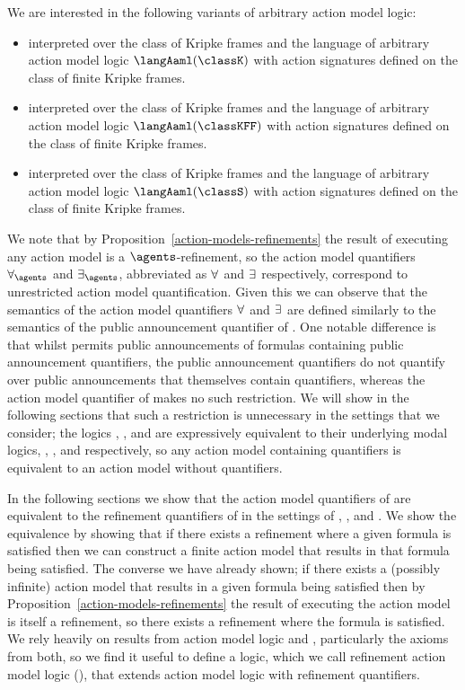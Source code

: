 We are interested in the following variants of arbitrary action model logic:
\begin{itemize}
    \item \logicAamlK{} interpreted over the class of \classK{} Kripke frames and the language of arbitrary action model logic $\langAaml(\classK)$ with action signatures defined on the class of finite \classK{} Kripke frames.
    \item \logicAamlKFF{} interpreted over the class of \classKFF{} Kripke frames and the language of arbitrary action model logic $\langAaml(\classKFF)$ with action signatures defined on the class of finite \classKFF{} Kripke frames.
    \item \logicAamlS{} interpreted over the class of \classS{} Kripke frames and the language of arbitrary action model logic $\langAaml(\classS)$ with action signatures defined on the class of finite \classS{} Kripke frames.
\end{itemize}

We note that by Proposition~\ref{action-models-refinements} the result of executing any action model is a $\agents$-refinement, so the action model quantifiers $\allactsAs$ and $\someactsAs$, abbreviated as $\allacts$ and $\someacts$ respectively, correspond to unrestricted action model quantification.
Given this we can observe that the semantics of the action model quantifiers $\allacts$ and $\someacts$ are defined similarly to the semantics of the public announcement quantifier of \logicApal{}.
One notable difference is that whilst \logicApal{} permits public announcements of formulas containing public announcement quantifiers, the public announcement quantifiers do not quantify over public announcements that themselves contain quantifiers, whereas the action model quantifier of \logicAaml{} makes no such restriction.
We will show in the following sections that such a restriction is unnecessary in the settings that we consider; the logics \logicAamlK{}, \logicAamlKFF{}, and \logicAamlS{} are expressively equivalent to their underlying modal logics, \logicK{}, \logicKFF{}, and \logicS{} respectively, so any action model containing quantifiers is equivalent to an action model without quantifiers.


In the following sections we show that the action model quantifiers of \logicAaml{} are equivalent to the refinement quantifiers of \logicRml{} in the settings of \classK{}, \classKFF{}, and \classS{}.
We show the equivalence by showing that if there exists a refinement where a given formula is satisfied then we can construct a finite action model that results in that formula being satisfied.
The converse we have already shown; if there exists a (possibly infinite) action model that results in a given formula being satisfied then by Proposition~\ref{action-models-refinements} the result of executing the action model is itself a refinement, so there exists a refinement where the formula is satisfied.
We rely heavily on results from action model logic and \logicRml{}, particularly the axioms from both, so we find it useful to define a logic, which we call refinement action model logic (\logicRaml{}), that extends action model logic with refinement quantifiers.

